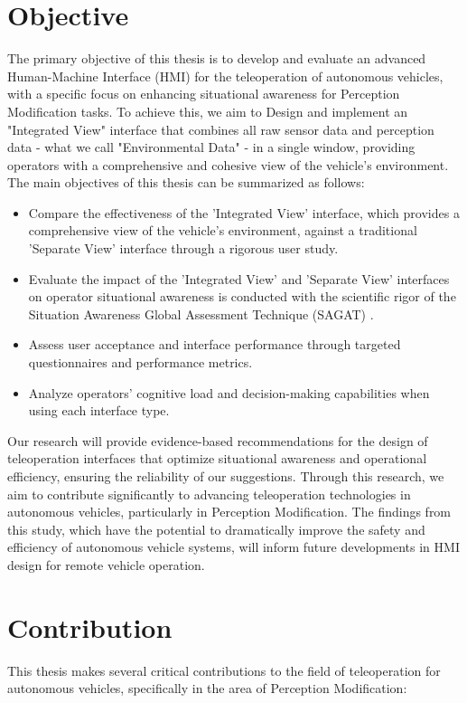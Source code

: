 \section{Objective}
The primary objective of this thesis is to develop and evaluate an advanced Human-Machine Interface (HMI) for the teleoperation of autonomous vehicles, with a specific focus on enhancing situational awareness for Perception Modification tasks. To achieve this, we aim to Design and implement an "Integrated View" interface that combines all raw sensor data and perception data - what we call "Environmental Data" - in a single window, providing operators with a comprehensive and cohesive view of the vehicle's environment. The main objectives of this thesis can be summarized as follows:
\begin{itemize}
    \item Compare the effectiveness of the 'Integrated View' interface, which provides a comprehensive view of the vehicle's environment, against a traditional 'Separate View' interface through a rigorous user study.
    \item Evaluate the impact of the 'Integrated View' and 'Separate View' interfaces on operator situational awareness is conducted with the scientific rigor of the Situation Awareness Global Assessment Technique (SAGAT) \cite{endsley1988sagat}.
    \item Assess user acceptance and interface performance through targeted questionnaires and performance metrics.
    \item Analyze operators' cognitive load and decision-making capabilities when using each interface type.
\end{itemize}
Our research will provide evidence-based recommendations for the design of teleoperation interfaces that optimize situational awareness and operational efficiency, ensuring the reliability of our suggestions. Through this research, we aim to contribute significantly to advancing teleoperation technologies in autonomous vehicles, particularly in Perception Modification. The findings from this study, which have the potential to dramatically improve the safety and efficiency of autonomous vehicle systems, will inform future developments in HMI design for remote vehicle operation.
\section{Contribution}
This thesis makes several critical contributions to the field of teleoperation for autonomous
vehicles, specifically in the area of Perception Modification:

